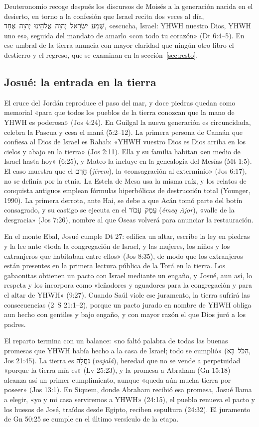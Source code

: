 \documentclass[11pt,letterpaper]{article}
\newcommand{\heb}[1]{\mbox{\foreignlanguage{hebrew}{#1}}}
\begin{document}
Deuteronomio recoge después los discursos de Moisés a la generación nacida en el desierto, en torno a la confesión que Israel recita dos veces al día, \heb{שְׁמַע יִשְׂרָאֵל יְהוָה אֱלֹהֵינוּ יְהוָה אֶחָד}, «escucha, Israel: YHWH nuestro Dios, YHWH uno es», seguida del mandato de amarlo «con todo tu corazón» (Dt 6:4–5). En ese umbral de la tierra anuncia con mayor claridad que ningún otro libro el destierro y el regreso, que se examinan en la sección~\ref{sec:resto}.

\subsection{Josué: la entrada en la tierra}
El cruce del Jordán reproduce el paso del mar, y doce piedras quedan como memorial «para que todos los pueblos de la tierra conozcan que la mano de YHWH es poderosa» (Jos 4:24). En Guilgal la nueva generación es circuncidada, celebra la Pascua y cesa el maná (5:2–12). La primera persona de Canaán que confiesa al Dios de Israel es Rahab: «YHWH vuestro Dios es Dios arriba en los cielos y abajo en la tierra» (Jos 2:11). Ella y su familia habitan «en medio de Israel hasta hoy» (6:25), y Mateo la incluye en la genealogía del Mesías (Mt 1:5). El caso muestra que el \heb{חֵרֶם} (\emph{jérem}), la «consagración al exterminio» (Jos 6:17), no se definía por la etnia. La Estela de Mesa usa la misma raíz, y los relatos de conquista antiguos emplean fórmulas hiperbólicas de destrucción total (Younger, 1990). La primera derrota, ante Hai, se debe a que Acán tomó parte del botín consagrado, y su castigo se ejecuta en el \heb{עֵמֶק עָכוֹר} (\emph{émeq Ajor}), «valle de la desgracia» (Jos 7:26), nombre al que Oseas volverá para anunciar la restauración.

En el monte Ebal, Josué cumple Dt 27: edifica un altar, escribe la ley en piedras y la lee ante «toda la congregación de Israel, y las mujeres, los niños y los extranjeros que habitaban entre ellos» (Jos 8:35), de modo que los extranjeros están presentes en la primera lectura pública de la Torá en la tierra. Los gabaonitas obtienen un pacto con Israel mediante un engaño, y Josué, aun así, lo respeta y los incorpora como «leñadores y aguadores para la congregación y para el altar de YHWH» (9:27). Cuando Saúl viole ese juramento, la tierra sufrirá las consecuencias (2~S 21:1–2), porque un pacto jurado en nombre de YHWH obliga aun hecho con gentiles y bajo engaño, y con mayor razón el que Dios juró a los padres.

El reparto termina con un balance: «no faltó palabra de todas las buenas promesas que YHWH había hecho a la casa de Israel; todo se cumplió» (\heb{הַכֹּל בָּא}, Jos 21:45). La tierra es \heb{נַחֲלָה} (\emph{najalá}), heredad que no se vende a perpetuidad «porque la tierra mía es» (Lv 25:23), y la promesa a Abraham (Gn 15:18) alcanza así un primer cumplimiento, aunque «queda aún mucha tierra por poseer» (Jos 13:1). En Siquem, donde Abraham recibió esa promesa, Josué llama a elegir, «yo y mi casa serviremos a YHWH» (24:15), el pueblo renueva el pacto y los huesos de José, traídos desde Egipto, reciben sepultura (24:32). El juramento de Gn 50:25 se cumple en el último versículo de la etapa.
\end{document}
